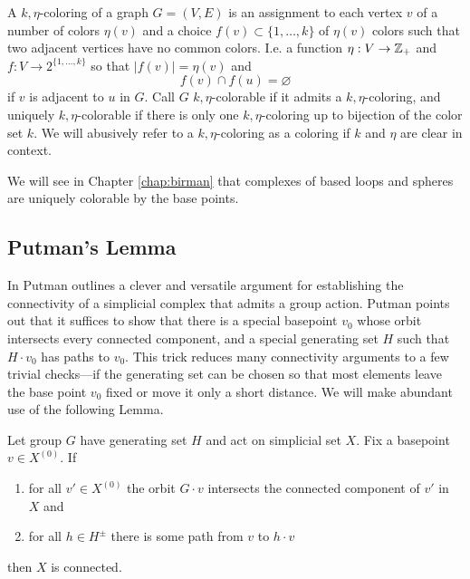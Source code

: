 \begin{definition}
  A $k,\eta$-coloring of a graph $G=(V,E)$
  is an assignment
  to each vertex $v$ of a number of colors $\eta(v)$
  and
  a choice $f(v) \subset \{1,\ldots,k\}$ of $\eta(v)$
  colors
  such that two adjacent vertices have no common colors.
  I.e. a function $\eta: V \to \mathbb{Z}_+$ and  $f: V \to 2^{\{1,\ldots,k\}}$
  so that $|f(v)| = \eta(v)$
  and
  $$f(v) \cap f(u) = \varnothing$$
  if $v$ is adjacent to $u$ in $G$.
  Call $G$ $k,\eta$-colorable if it admits a $k,\eta$-coloring,
  and uniquely $k,\eta$-colorable if there is only one $k,\eta$-coloring up to bijection of the color set $k$.
  We will abusively refer to a $k,\eta$-coloring as a coloring if $k$ and $\eta$ are clear in context.
  \label{def:color}
\end{definition}

We will see in Chapter \ref{chap:birman} that complexes of based loops and spheres are uniquely colorable by the base points.


\subsection{Putman's Lemma}

In \cite{putman} Putman outlines a clever and versatile argument
for establishing the connectivity of a simplicial complex that admits a group action.
Putman points out that it suffices to show that
there is a special basepoint $v_0$ whose orbit intersects every connected component, and a special generating set $H$ such that $H\cdot v_0$ has paths to $v_0$.
This trick reduces many connectivity arguments to
a few trivial checks---if the generating set can be chosen so that most elements leave the base point $v_0$ fixed
or move it only a short distance.
We will make abundant use of the following Lemma.


\begin{lemma}
  \label{lemma:putman}
  Let group $G$ have generating set $H$ and act on simplicial set $X$.
  Fix a basepoint $v \in X^{(0)}$.
  If
  \begin{enumerate}
  \item for all $v' \in X^{(0)}$ the orbit $G\cdot v$ intersects the connected component of $v'$ in $X$ and
  \item for all $h \in H^{\pm}$ there is some path from $v$ to $h\cdot v$
  \end{enumerate}
  then $X$ is connected.
\end{lemma}

